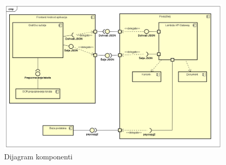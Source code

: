 			 \begin{figure}[H]
			 	\includegraphics[width=\linewidth]{./dijagrami/Dijagram_komponenti.png}
			 	\caption{Dijagram komponenti}
			 	\label{fig:DK}
			 \end{figure}